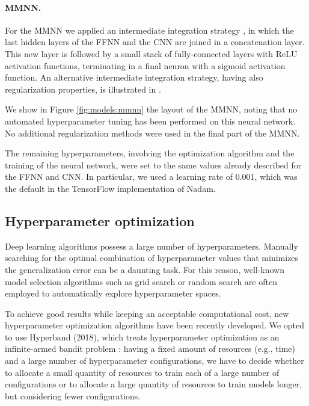 \documentclass{article}
\begin{document}
\paragraph{MMNN.} For the MMNN we applied an intermediate integration strategy \cite{li_wu16}, in which the last hidden layers of the FFNN and the CNN are joined in a concatenation layer. This new layer is followed by a small stack of fully-connected layers with ReLU activation functions, terminating in a final neuron with a sigmoid activation function. An alternative intermediate integration strategy, having also regularization properties, is illustrated in \cite{choi19}.

We show in Figure \ref{fig:models:mmnn} the layout of the MMNN, noting that no automated hyperparameter tuning has been performed on this neural network. No additional regularization methods were used in the final part of the MMNN. 

The remaining hyperparameters, involving the optimization algorithm and the training of the neural network, were set to the same values already described for the FFNN and CNN. In particular, we used a learning rate of 0.001, which was the default in the TensorFlow implementation of Nadam.

\subsection{Hyperparameter optimization}
\label{subsec:hyperparam_opt}

Deep learning algorithms possess a large number of hyperparameters. Manually searching for the optimal combination of hyperparameter values that minimizes the generalization error can be a daunting task. For this reason, well-known model selection algorithms such as grid search or random search are often employed to automatically explore hyperparameter spaces.

To achieve good results while keeping an acceptable computational cost, new hyperparameter optimization algorithms have been recently developed. We opted to use Hyperband (2018), which treats hyperparameter optimization as an infinite-armed bandit problem \cite{li18hyperband}: having a fixed amount of resources (e.g., time) and a large number of hyperparameter configurations, we have to decide whether to allocate a small quantity of resources to train each of a large number of configurations or to allocate a large quantity of resources to train models longer, but considering fewer configurations. 
\end{document}
